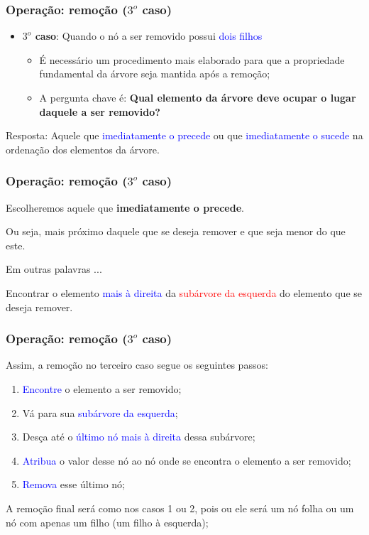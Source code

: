 \documentclass{beamer}
\newcommand{\tcb}[1]{\textcolor{blue}{#1}}
\newcommand{\tcr}[1]{\textcolor{red}{#1}}
\begin{document}
\begin{frame}
  \frametitle{Operação: remoção ($3^o$ caso)}

  \begin{itemize}
    \item \textbf{$3^o$ caso}: Quando o nó a ser removido possui \tcb{dois filhos}
    \begin{itemize}
      \item É necessário um procedimento mais elaborado para que a propriedade fundamental da árvore
        seja mantida após a remoção;
      \item A pergunta chave é: \textbf{Qual elemento da árvore deve ocupar o lugar daquele a ser removido?}
    \end{itemize}
  \end{itemize}
  \pause

  Resposta: Aquele que \tcb{imediatamente o precede} ou que \tcb{imediatamente o sucede} na ordenação dos elementos da árvore.

\end{frame}

\begin{frame}[c]
  \frametitle{Operação: remoção ($3^o$ caso)}

  \centering
  Escolheremos aquele que \textbf{imediatamente o precede}. 

  \vspace{1cm}

  Ou seja, mais próximo daquele que se deseja remover e que seja menor do que este.
  
  \vspace{1cm}


  Em outras palavras ...
  \pause
  
  \vspace{1cm}

  Encontrar o elemento \tcb{mais à direita} da \tcr{subárvore da esquerda} do elemento que se deseja remover.

\end{frame}

\begin{frame}[c]
  \frametitle{Operação: remoção ($3^o$ caso)}

  Assim, a remoção no terceiro caso segue os seguintes passos:

  \begin{enumerate}
    \item \tcb{Encontre} o elemento a ser removido;
    \item Vá para sua \tcb{subárvore da esquerda};
    \item Desça até o \tcb{último nó mais à direita} dessa subárvore;
    \item \tcb{Atribua} o valor desse nó ao nó onde se encontra o elemento a ser removido;
    \item \tcb{Remova} esse último nó;
  \end{enumerate}

  A remoção final será como nos casos 1 ou 2, pois ou ele será um nó folha ou um nó com apenas um filho
  (um filho à esquerda);
\end{frame}
\end{document}
